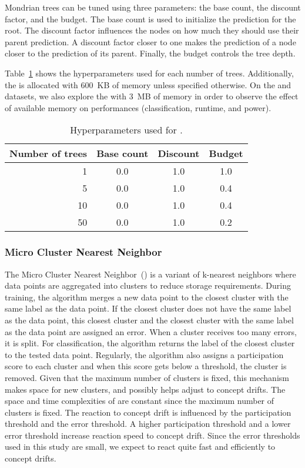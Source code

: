 Mondrian trees can be tuned using three
parameters: the base count, the discount factor,
and the budget. The base count is used to
initialize the prediction for the root. The
discount factor influences the nodes on how much
they should use their parent prediction. A
discount factor closer to one makes the prediction
of a node closer to the prediction of its parent.
Finally, the budget controls the tree depth.

Table~\ref{table:hyperparameter-mondrian} shows
the hyperparameters used for each number of trees.
Additionally, the \mondrianforest is allocated
with 600~KB of memory unless specified otherwise.
On the \banosdataset and \recofitdataset datasets,
we also explore the \mondrianforest with 3~MB of
memory in order to observe the effect of available memory on
performances (classification, runtime, and power).
\begin{table}
	\begin{center}
		\begin{tabular}{|| r | c | c | c ||} 
			\hline
			Number of trees &  Base count & Discount & Budget \\ [0.5ex] 
			\hline\hline
			1 & 0.0 & 1.0 & 1.0 \\
			5 & 0.0 & 1.0 & 0.4 \\
			10 & 0.0 & 1.0 & 0.4 \\
			50 & 0.0 & 1.0 & 0.2 \\
			\hline
		\end{tabular}
	\end{center}
	\caption{Hyperparameters used for \mondrianforest.}
		\label{table:hyperparameter-mondrian}
\end{table}
\subsubsection{Micro Cluster Nearest Neighbor~\cite{mc-nn}}
The Micro Cluster Nearest Neighbor~(\mcnn) is a
variant of k-nearest neighbors where data points
are aggregated into clusters to reduce storage
requirements.  During training, the algorithm
merges a new data point to the closest cluster
with the same label as the data point. If the closest cluster
does not have the same label as the data point,
this closest cluster and the closest cluster with
the same label as the data point are assigned an error. When a
cluster receives too many errors, it is split.
For classification, the algorithm returns the label of
the closest cluster to the tested data point.  Regularly, the algorithm
also assigns a participation score to each cluster
and when this score gets below a threshold, the
cluster is removed. Given that the maximum number
of clusters is fixed, this mechanism makes
space for new clusters, and possibly
helps adjust to concept drifts.  
The space and time complexities of \mcnn are
constant since the maximum number of clusters is fixed.
The reaction to concept drift is influenced by the
participation threshold and the error threshold.
A higher participation threshold and a lower error
threshold increase reaction speed to concept
drift. Since the error thresholds used in this
study are small, we expect \mcnn to react quite
fast and efficiently to concept drifts.

